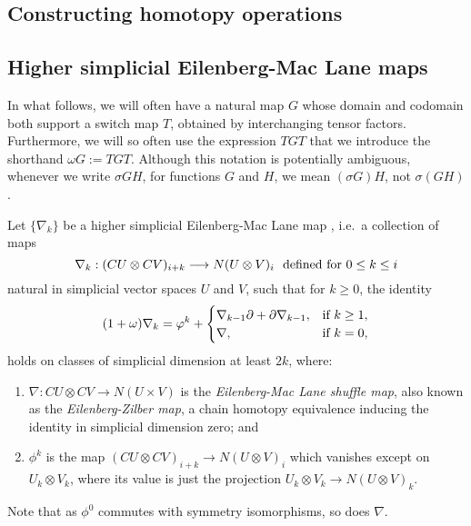 \documentclass[11pt]{amsart} \renewcommand{\baselinestretch}{1.2}
\theoremstyle{plain}
\numberwithin{equation}{section} %
\theoremstyle{plain}
\numberwithin{equation}{chapter} %
\let\oldphi\phi
\let\phi\varphi
\renewcommand{\to}{\longrightarrow}
\newcommand{\squishlist}{
}
\newcommand{\citeBOX}[2][]{\cite[\mbox{#1}]{#2}}
\newcommand{\twist}{\omega}
\newcommand{\Nabla}{\nabla}
\newcommand{\SectionOrChapter}[1]{\section{\textbf{#1}}}
\newcommand{\SubsectionOrSection}[1]{\subsection{#1}}
\begin{document}
\begin{Constructing homotopy operations}



\SectionOrChapter{Constructing homotopy operations}
\label{sec:Constructing homotopy operations}
\label{Constructing homotopy operations}
\SubsectionOrSection{Higher simplicial Eilenberg-Mac Lane maps}%


In what follows, we will often have a natural map $G$ whose domain and codomain both support a switch map $T$, obtained by interchanging tensor factors. Furthermore, we will so often  use  the expression $TGT$ that we introduce the shorthand $\twist G:=TGT$. %
Although this notation is potentially ambiguous, whenever we write $\sigma GH$, for functions $G$ and $H$, we mean $(\sigma G)H$, not $\sigma(GH)$.

Let $\{\Nabla_k\}$ be a higher simplicial Eilenberg-Mac Lane map \citeBOX[\S3]{DwyerHtpyOpsSimpComAlg.pdf}, i.e.\ a collection of maps
\[\Nabla_k:(CU\otimes CV)_{i+k}\to N(U\otimes V)_i\textup{\ \ defined for $0\leq k\leq i$}\]
natural in simplicial vector spaces $U$ and $V$, such that for $k\geq0$, the identity
\[(1+\twist) \Nabla_k=\oldphi^k+\begin{cases}
\Nabla_{k-1}\partial+\partial\Nabla_{k-1},&\textup{if }k\geq1,\\
\Nabla,&\textup{if }k=0,
\end{cases}
\]
holds on classes of simplicial dimension at least $2k$, where:
\begin{enumerate}\squishlist
\item $\Nabla:CU\otimes CV\to N(U\times V)$ is the \emph{Eilenberg-Mac Lane shuffle map}, also known as the \emph{Eilenberg-Zilber map}, a chain homotopy equivalence inducing the identity in simplicial dimension zero; and
\item $\oldphi^k$ is the map $(CU\otimes CV)_{i+k}\to N(U\otimes V)_i$ which vanishes except on $U_k\otimes V_k$, where its value is just the projection $U_k\otimes V_k\to N(U\otimes V)_k$.
\end{enumerate}
Note that as $\oldphi^0$ commutes with symmetry isomorphisms, so does $\Nabla$.






\end{Constructing homotopy operations}
\end{document}
